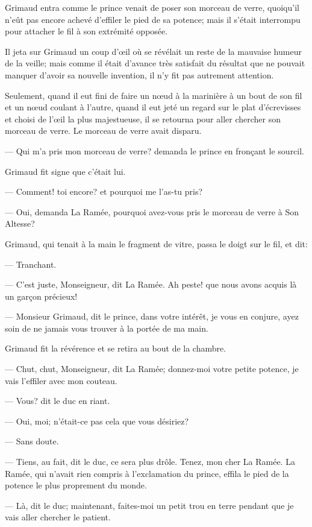 Grimaud entra comme le prince venait de poser son morceau de verre, quoiqu'il n'eût pas encore achevé d'effiler le pied de sa potence; mais il s'était interrompu pour attacher le fil à son extrémité opposée.

Il jeta sur Grimaud un coup d'œil où se révélait un reste de la mauvaise humeur de la veille; mais comme il était d'avance très satisfait du résultat que ne pouvait manquer d'avoir sa nouvelle invention, il n'y fit pas autrement attention.

Seulement, quand il eut fini de faire un nœud à la marinière à un bout de son fil et un nœud coulant à l'autre, quand il eut jeté un regard sur le plat d'écrevisses et choisi de l'œil la plus majestueuse, il se retourna pour aller chercher son morceau de verre. Le morceau de verre avait disparu.

— Qui m'a pris mon morceau de verre? demanda le prince en fronçant le sourcil.

Grimaud fit signe que c'était lui.

— Comment! toi encore? et pourquoi me l'as-tu pris?

— Oui, demanda La Ramée, pourquoi avez-vous pris le morceau de verre à Son Altesse?

Grimaud, qui tenait à la main le fragment de vitre, passa le doigt sur le fil, et dit:

— Tranchant.

— C'est juste, Monseigneur, dit La Ramée. Ah peste! que nous avons acquis là un garçon précieux!

— Monsieur Grimaud, dit le prince, dans votre intérêt, je vous en conjure, ayez soin de ne jamais vous trouver à la portée de ma main.

Grimaud fit la révérence et se retira au bout de la chambre.

— Chut, chut, Monseigneur, dit La Ramée; donnez-moi votre petite potence, je vais l'effiler avec mon couteau.

— Vous? dit le duc en riant.

— Oui, moi; n'était-ce pas cela que vous désiriez?

— Sans doute.

— Tiens, au fait, dit le duc, ce sera plus drôle. Tenez, mon cher La Ramée.
La Ramée, qui n'avait rien compris à l'exclamation du prince, effila le pied de la potence le plus proprement du monde.

— Là, dit le duc; maintenant, faites-moi un petit trou en terre pendant que je vais aller chercher le patient.

